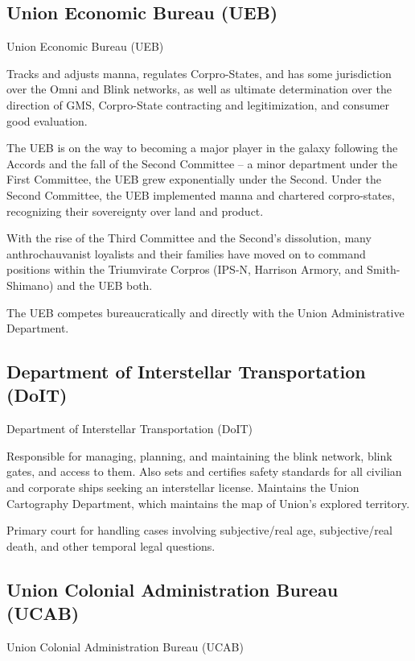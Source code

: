  
\subsection{Union Economic Bureau (UEB) }

Union Economic Bureau (UEB)  

Tracks and adjusts manna, regulates Corpro-States, and has some jurisdiction over the Omni  
and Blink networks, as well as ultimate determination over the direction of GMS, Corpro-State  
contracting and legitimization, and consumer good evaluation.  
 

The UEB is on the way to becoming a major player in the galaxy following the Accords and the  
fall of the Second Committee -- a minor department under the First Committee, the UEB grew  
exponentially under the Second. Under the Second Committee, the UEB implemented manna  
and chartered corpro-states, recognizing their sovereignty over land and product. 
 

With the rise of the Third Committee and the Second’s dissolution, many anthrochauvanist  
loyalists and their families have moved on to command positions within the Triumvirate Corpros  
(IPS-N, Harrison Armory, and Smith-Shimano) and the UEB both. 
 

The UEB competes bureaucratically and directly with the Union Administrative Department.
 
\subsection{Department of Interstellar Transportation (DoIT)}
Department of Interstellar Transportation (DoIT)  

                                                                                                                 


Responsible for managing, planning, and maintaining the blink network, blink gates, and access  
to them. Also sets and certifies safety standards for all civilian and corporate ships seeking an  
interstellar license. Maintains the Union Cartography Department, which maintains the map of  
Union’s explored territory. 
 

Primary court for handling cases involving subjective/real age, subjective/real death, and other  
temporal legal questions. 
 
\subsection{Union Colonial Administration Bureau (UCAB)}
Union Colonial Administration Bureau (UCAB)  


